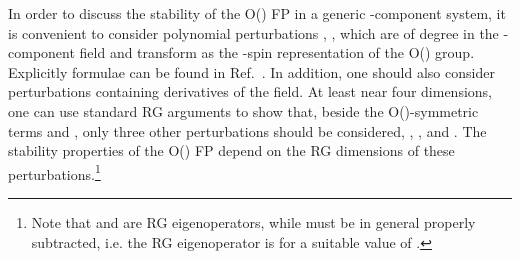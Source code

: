 \documentclass[a4paper,12pt]{article}
\begin{document}
In order to discuss the stability of the O(\coordHE{}) FP  in a 
generic \coordHE{}-component system, 
it is convenient to consider polynomial perturbations  
\coordHE{}, 
\coordHE{}, which are of degree \coordHE{} in the \coordHE{}-component field \coordHE{}
and transform as the \coordHE{}-spin representation of the O(\coordHE{}) group.
Explicitly formulae can be found in Ref.~\cite{CPV-02-mc}.
In addition, one should also consider perturbations containing
derivatives of the field. 
At least near four dimensions, one can use
standard RG arguments to show that, 
beside the O(\coordHE{})-symmetric terms \coordHE{} and 
\coordHE{}, only three other perturbations should be 
considered, \coordHE{}, \coordHE{}, and 
\coordHE{}.
The stability properties 
of the O(\coordHE{}) FP depend on the RG dimensions \coordHE{} of these 
perturbations.\footnote{Note that \coordHE{} and 
\coordHE{} are RG eigenoperators, while \coordHE{} 
must be in general properly subtracted, i.e. the 
RG eigenoperator is \coordHE{} for a suitable value of \coordHE{}.}
\end{document}
